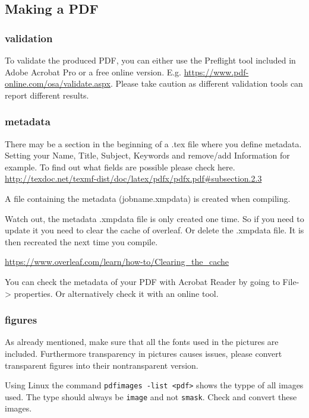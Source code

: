 	\subsection{Making a PDF}

	
	\subsubsection{validation}
	To validate the produced PDF, you can either use the Preflight tool included in Adobe Acrobat Pro or a free online version. E.g. \url{https://www.pdf-online.com/osa/validate.aspx}.
	Please take caution as different validation tools can report different results.
	
	\subsubsection{metadata}
	There may be a section in the beginning of a .tex file where you define metadata.
	Setting your Name, Title, Subject, Keywords and remove/add Information for example. To find out what fields are possible please check here. \url{http://texdoc.net/texmf-dist/doc/latex/pdfx/pdfx.pdf#subsection.2.3}
	
	A file containing the metadata (jobname.xmpdata) is created when compiling. 
	
	Watch out, the metadata .xmpdata file is only created one time. So if you need to update it you need to clear the cache of overleaf. Or delete the .xmpdata file. It is then recreated the next time you compile. 
	
	\url{https://www.overleaf.com/learn/how-to/Clearing_the_cache}
	
	You can check the metadata of your PDF with Acrobat Reader by going to File-> properties. Or alternatively check it with an online tool.
	
	\subsubsection{figures}
	As already mentioned, make sure that all the fonts used in the pictures are included. Furthermore transparency in pictures causes issues, please convert transparent figures into their nontransparent version. 
	
	Using Linux the command \verb|pdfimages -list <pdf>| shows the typpe of all images used. The type should always be \verb|image| and not \verb|smask|. Check and convert these images.
	
